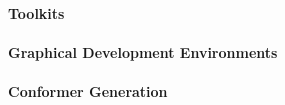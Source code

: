 \paragraph{Toolkits}

\paragraph{Graphical Development Environments}


\paragraph{Conformer Generation}